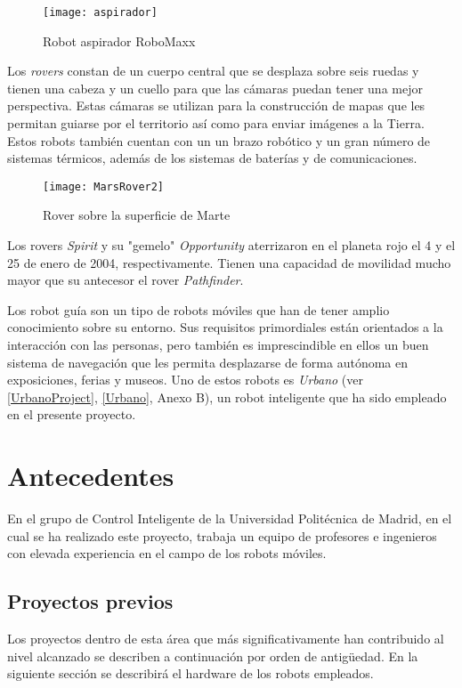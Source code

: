 \begin{figure}[h]
  \centering\texttt{[image: aspirador]}\\
  \caption{Robot aspirador RoboMaxx }\label{fg:aspirador}
\end{figure}

Los \emph{rovers} constan de un cuerpo central que se desplaza sobre seis ruedas y tienen una cabeza y un cuello para que las cámaras puedan tener una mejor perspectiva. Estas cámaras se utilizan para la construcción de mapas que les permitan guiarse por el territorio así como para enviar imágenes a la Tierra. Estos robots también cuentan con un un brazo robótico y un gran número de sistemas térmicos, además de los sistemas de baterías y de comunicaciones.

\begin{figure}[h]
  \centering\texttt{[image: MarsRover2]}\\
  \caption{Rover sobre la superficie de Marte}\label{fg:rover}
\end{figure}

Los rovers \emph{Spirit} y su "gemelo" \emph{Opportunity} aterrizaron en el planeta rojo el 4 y el 25 de enero de 2004, respectivamente. Tienen una capacidad de movilidad mucho mayor que su antecesor el rover \emph{Pathfinder}.

Los robot guía son un tipo de robots móviles que han de tener amplio conocimiento sobre su entorno. Sus requisitos primordiales están orientados a la interacción con las personas, pero también es imprescindible en ellos un buen sistema de navegación que les permita desplazarse de forma autónoma en exposiciones, ferias y museos. Uno de estos robots es \emph{Urbano} (ver \ref{UrbanoProject}, \ref{Urbano}, Anexo B), un robot inteligente que ha sido empleado en el presente proyecto.

\section{Antecedentes}

En el grupo de Control Inteligente de la Universidad Politécnica de Madrid, en el cual se ha realizado este proyecto, trabaja un equipo de profesores e ingenieros con elevada experiencia en el campo de los robots móviles.

\subsection{Proyectos previos}
Los proyectos dentro de esta área que más significativamente han contribuido al nivel alcanzado se describen a continuación por orden de antigüedad. En la siguiente sección se describirá el hardware de los robots empleados.


